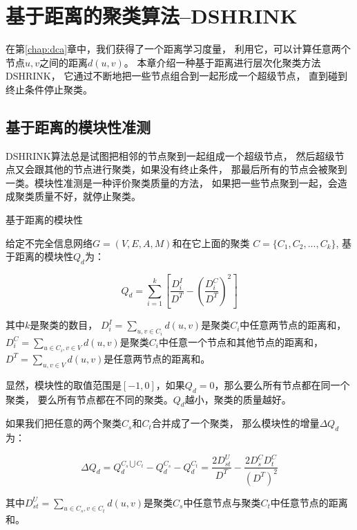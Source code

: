 \chapter{基于距离的聚类算法--DSHRINK}
\label{chap:dshrink}

在第\ref{chap:dca}章中，我们获得了一个距离学习度量，
利用它，可以计算任意两个节点$u, v$之间的距离$d(u, v)$。
本章介绍一种基于距离进行层次化聚类方法DSHRINK，
它通过不断地把一些节点组合到一起形成一个超级节点，
直到碰到终止条件停止聚类。

\section{基于距离的模块性准测}

DSHRINK算法总是试图把相邻的节点聚到一起组成一个超级节点，
然后超级节点又会跟其他的节点进行聚类，如果没有终止条件，
那最后所有的节点会被聚到一类。模块性准测是一种评价聚类质量的方法，
如果把一些节点聚到一起，会造成聚类质量不好，就停止聚类。

\begin{defn}{基于距离的模块性}
    \label{defn:density-based-modularity}

    给定不完全信息网络$G = (V, E, A, M)$和在它上面的聚类
    $C = \{C_1, C_2, ..., C_k\}$, 基于距离的模块性$Q_d$为：

    \begin{equation}
    Q_d = \sum_{i=1}^k [ \frac{D_i^I}{D^T} - (\frac{D_i^C}{D^T})^2]
    \end{equation}

    其中$k$是聚类的数目，
    $D_i^I = \sum_{u,v \in C_i} d(u,v)$是聚类$C_i$中任意两节点的距离和，
    $D_i^C = \sum_{u \in C_i, v \in V} d(u,v)$是聚类$C_i$中任意一个节点和其他节点的距离和，
    $D^T = \sum_{u,v \in V} d(u,v)$是任意两节点的距离和。

\end{defn}

显然，模块性的取值范围是$[-1,0]$，如果$Q_d = 0$，那么要么所有节点都在同一个聚类，
要么所有节点都在不同的聚类。$Q_d$越小，聚类的质量越好。

如果我们把任意的两个聚类$C_s$和$C_t$合并成了一个聚类，
那么模块性的增量$\Delta Q_d$为：

\begin{equation}
\label{equa:delta-qd}
    \Delta Q_d = Q_d^{C_s \bigcup C_t} - Q_d^{C_s} - Q_d^{C_t} = \frac{2D_{st}^U}{D^T} - \frac{2D_s^CD_t^C}{(D^T)^2}
\end{equation}

其中$D_{st}^U = \sum_{u \in C_s, v \in C_t} d(u,v)$是聚类$C_s$中任意节点与聚类$C_t$中任意节点的距离和。

